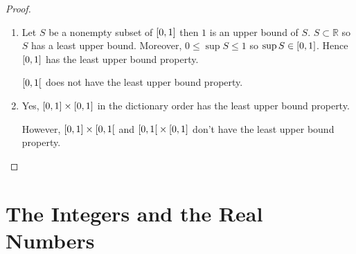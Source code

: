 \begin{proof}
    \begin{enumerate}[label={(\alph*)}]
        \item Let $S$ be a nonempty subset of $\left[{0, 1}\right]$ then $1$ is an upper bound of $S$. $S\subset\mathbb{R}$ so $S$ has a least upper bound. Moreover, $0\leq \sup S\leq 1$ so $\sup S\in\left[{0, 1}\right]$. Hence $\left[{0, 1}\right]$ has the least upper bound property.

              $\left[{0, 1}\right[$ does not have the least upper bound property.
        \item Yes, $\left[{0, 1}\right]\times\left[{0, 1}\right]$ in the dictionary order has the least upper bound property.

              However, $\left[{0, 1}\right]\times\left[{0, 1}\right[$ and $\left[{0, 1}\right[\times\left[{0, 1}\right]$ don't have the least upper bound property.
    \end{enumerate}
\end{proof}

\section{The Integers and the Real Numbers}

